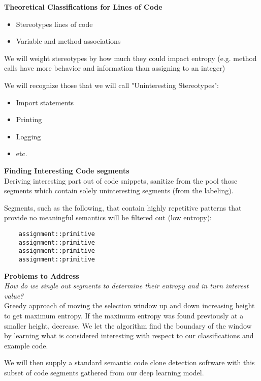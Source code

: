 \documentclass{article}
\begin{document}
    \textbf{Theoretical Classifications for Lines of Code}
    \begin{itemize}
        \item Stereotypes lines of code
        \item Variable and method associations
    \end{itemize}
    We will weight stereotypes by how much they could impact entropy (e.g. method calls have more behavior and information than assigning to an integer)

    We will recognize those that we will call "Uninteresting Stereotypes":
    \begin{itemize}
        \item Import statements
        \item Printing
        \item Logging
        \item etc.
    \end{itemize}

    \textbf{Finding Interesting Code segments}\\
    Deriving interesting part out of code snippets, sanitize from the pool those segments which contain solely uninteresting segments (from the labeling).

    Segments, such as the following, that contain highly repetitive patterns that provide no meaningful semantics will be filtered out (low entropy):
    \begin{lstlisting}
    assignment::primitive
    assignment::primitive
    assignment::primitive
    assignment::primitive
    \end{lstlisting}
    \textbf{Problems to Address}\\
    \textit{How do we single out segments to determine their entropy and in turn interest value?}\\
    Greedy approach of moving the selection window up and down increasing height to get maximum entropy. If the maximum entropy was found previously at a smaller height, decrease.
    We let the algorithm find the boundary of the window by learning what is considered interesting with respect to our classifications and example code.

    We will then supply a standard semantic code clone detection software with this subset of code segments gathered from our deep learning model.
\end{document}
